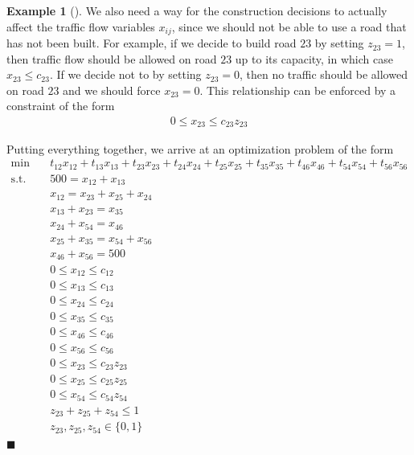 \documentclass[11pt]{article}
\theoremstyle{definition} %
\newtheorem{ex}{Example}[section] %
\newenvironment{example}[1][]{\begin{ex}[#1]}{\hfill$\blacksquare$\end{ex}} %
\begin{document}
\begin{example}
	We also need a way for the construction decisions to actually affect the traffic flow variables $x_{ij}$, since we should not be able to use a road that has not been built. For example, if we decide to build road $23$ by setting $z_{23} = 1$, then traffic flow should be allowed on road $23$ up to its capacity, in which case $x_{23} \le c_{23}$. If we decide not to by setting $z_{23} = 0$, then no traffic should be allowed on road $23$ and we should force $x_{23} = 0$. This relationship can be enforced by a constraint of the form
	\begin{align*}
		0 \le x_{23} \le c_{23} z_{23}
	\end{align*}
	
	Putting everything together, we arrive at an optimization problem of the form
	\begin{align*}
		\tag{minimize total driving time across all roads} \min \quad& t_{12} x_{12} + t_{13} x_{13} + t_{23} x_{23} + t_{24} x_{24} + t_{25} x_{25} + t_{35} x_{35} + t_{46} x_{46} + t_{54} x_{54} + t_{56} x_{56} \\
		\tag{inflow = outflow at intersection 1} \mathrm{s.t.} \quad& 500 = x_{12} + x_{13} \\
		\tag{inflow = outflow at intersection 2} & x_{12} = x_{23} + x_{25} + x_{24} \\
		\tag{inflow = outflow at intersection 3} & x_{13} + x_{23} = x_{35} \\
		\tag{inflow = outflow at intersection 4} & x_{24} + x_{54} = x_{46} \\
		\tag{inflow = outflow at intersection 5} & x_{25} + x_{35} = x_{54} + x_{56} \\
		\tag{inflow = outflow at intersection 6} & x_{46} + x_{56} = 500 \\
		\tag{capacity of road $12$} & 0 \le x_{12} \le c_{12} \\
		\tag{capacity of road $13$} & 0 \le x_{13} \le c_{13} \\
		\tag{capacity of road $24$} & 0 \le x_{24} \le c_{24} \\
		\tag{capacity of road $35$} & 0 \le x_{35} \le c_{35} \\
		\tag{capacity of road $46$} & 0 \le x_{46} \le c_{46} \\
		\tag{capacity of road $56$} & 0 \le x_{56} \le c_{56} \\
		\tag{capacity and construction of road $23$} & 0 \le x_{23} \le c_{23} z_{23} \\
		\tag{capacity and construction of road $25$} & 0 \le x_{25} \le c_{25} z_{25} \\
		\tag{capacity and construction of road $54$} & 0 \le x_{54} \le c_{54} z_{54} \\
		\tag{limit construction to 1 road} & z_{23} + z_{25} + z_{54} \le 1 \\
		\tag{binary construction decisions} & z_{23}, z_{25}, z_{54} \in \{0,1\}
	\end{align*}
\end{example}
\end{document}
